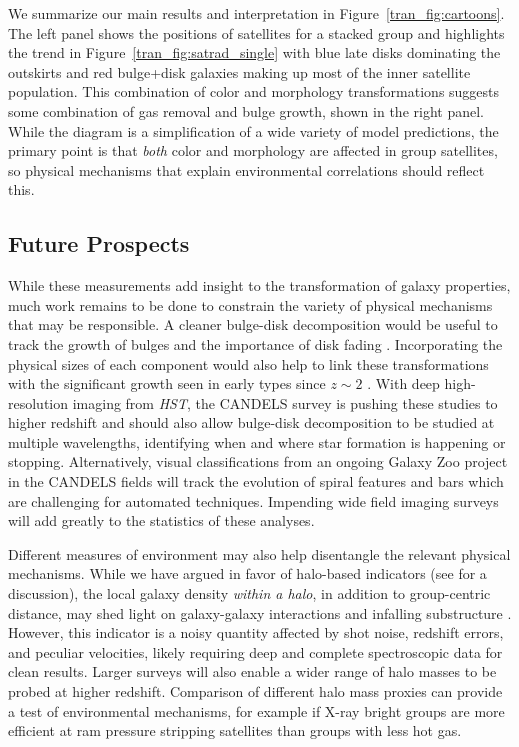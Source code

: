 We summarize our main results and interpretation in
  Figure~\ref{tran_fig:cartoons}. The left panel shows the positions of
  satellites for a stacked group and highlights the trend in
  Figure~\ref{tran_fig:satrad_single} with blue late disks dominating the
  outskirts and red bulge+disk galaxies making up most of the inner
  satellite population. This combination of color and morphology
  transformations suggests some combination of gas removal and bulge
  growth, shown in the right panel. While the diagram is a
  simplification of a wide variety of model predictions, the primary
  point is that \textit{both} color and morphology are affected in
  group satellites, so physical mechanisms that explain environmental
  correlations should reflect this.

\subsection{Future Prospects}

While these measurements add insight to the transformation of galaxy
properties, much work remains to be done to constrain the variety of
physical mechanisms that may be responsible. A cleaner bulge-disk
decomposition would be useful to track the growth of bulges and the
importance of disk fading \citep[e.g.,][]{Lackner2012,
  Lackner2013}. Incorporating the physical sizes of each component
would also help to link these transformations with the significant
growth seen in early types since $z\sim2$
\citep[e.g.,][]{Bruce2012}. With deep high-resolution imaging from
\textit{HST}, the CANDELS survey \citep{Grogin2011,Koekemoer2011} is pushing these
studies to higher redshift and should also allow bulge-disk
decomposition to be studied at multiple wavelengths, identifying when
and where star formation is happening or stopping. Alternatively,
visual classifications from an ongoing Galaxy Zoo project in the
CANDELS fields will track the evolution of spiral features and bars
which are challenging for automated techniques. Impending wide field
imaging surveys will add greatly to the statistics of these analyses.

Different measures of environment may also help disentangle the
relevant physical mechanisms. While we have argued in favor of
halo-based indicators (see \citealt{George2011} for a discussion), the
local galaxy density \textit{within a halo}, in addition to
group-centric distance, may shed light on galaxy-galaxy interactions
and infalling substructure \citep[e.g.,][]{Blanton2007, Cibinel2012b,
  Woo2012}. However, this indicator is a noisy quantity affected by
shot noise, redshift errors, and peculiar velocities, likely
requiring deep and complete spectroscopic data for clean
results. Larger surveys will also enable a wider range of halo masses
to be probed at higher redshift. Comparison of different halo mass
proxies can provide a test of environmental mechanisms, for example if
X-ray bright groups are more efficient at ram pressure stripping
satellites than groups with less hot gas.

